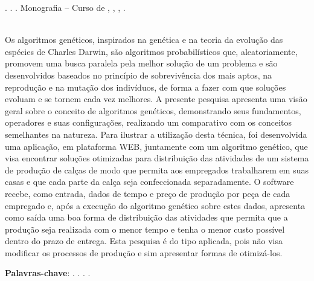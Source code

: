 
\begin{OnehalfSpacing} 

\noindent \imprimirAutorCitacaoMaiuscula. {\bfseries\imprimirtitulo}. {\imprimirdata}.  Monografia -- Curso de {\MakeUppercase\imprimircurso}, {\imprimirinstituicao}, {\imprimirlocal}, {\imprimirdata}.

\vspace{\onelineskip}
\vspace{\onelineskip}
\vspace{\onelineskip}
\vspace{\onelineskip}

\begin{resumo}
~\\
\noindent Os algoritmos genéticos, inspirados na genética e na teoria da evolução das espécies de Charles Darwin,
são algoritmos probabilísticos que, aleatoriamente, promovem uma busca paralela pela melhor solução de um problema e são 
desenvolvidos baseados no princípio de sobrevivência dos mais aptos, na reprodução e na mutação dos indivíduos, de forma a fazer com 
que soluções evoluam e se tornem cada vez melhores. A presente pesquisa apresenta uma visão geral sobre
o conceito de algoritmos genéticos, demonstrando seus fundamentos, operadores e suas configurações, realizando um comparativo 
com os conceitos semelhantes na natureza. Para ilustrar a utilização desta técnica, foi desenvolvida uma aplicação, 
em plataforma WEB, juntamente com um algoritmo genético, que visa encontrar soluções otimizadas para distribuição 
das atividades de um sistema de produção de calças de modo que permita aos empregados trabalharem em suas 
casas e que cada parte da calça seja confeccionada separadamente. O software recebe, como entrada, dados de tempo e preço
de produção por peça de cada empregado e, após a execução do algoritmo genético sobre estes dados, apresenta como saída uma 
boa forma de distribuição das atividades que permita que a produção seja realizada com o menor tempo e tenha o menor custo possível 
dentro do prazo de entrega. Esta pesquisa é do tipo aplicada, pois não visa modificar os processos de produção e sim apresentar 
formas de otimizá-los.

\vspace{\onelineskip}
\vspace*{\fill}
\noindent \textbf{Palavras-chave}: \imprimirPalavraChaveUm. \imprimirPalavraChaveDois. \imprimirPalavraChaveTres. \imprimirPalavraChaveQuatro.
\vspace{\onelineskip}
\end{resumo}

\end{OnehalfSpacing}
